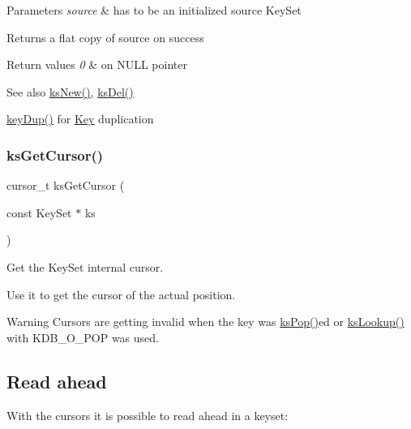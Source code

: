 \begin{DoxyParams}{Parameters}
{\em source} & has to be an initialized source Key\+Set \\
\hline
\end{DoxyParams}
\begin{DoxyReturn}{Returns}
a flat copy of source on success 
\end{DoxyReturn}

\begin{DoxyRetVals}{Return values}
{\em 0} & on N\+U\+LL pointer \\
\hline
\end{DoxyRetVals}
\begin{DoxySeeAlso}{See also}
\hyperlink{group__keyset_ga671e1aaee3ae9dc13b4834a4ddbd2c3c}{ks\+New()}, \hyperlink{group__keyset_ga27e5c16473b02a422238c8d970db7ac8}{ks\+Del()} 

\hyperlink{group__key_gae6ec6a60cc4b8c1463fa08623d056ce3}{key\+Dup()} for \hyperlink{group__key}{Key} duplication 
\end{DoxySeeAlso}
\mbox{\label{group__keyset_gaffe507ab9281c322eb16c3e992075d29}} 
\subsubsection{\texorpdfstring{ks\+Get\+Cursor()}{ksGetCursor()}}
{\footnotesize\ttfamily cursor\+\_\+t ks\+Get\+Cursor (\begin{DoxyParamCaption}\item[{const Key\+Set $\ast$}]{ks }\end{DoxyParamCaption})}



Get the Key\+Set internal cursor. 

Use it to get the cursor of the actual position.

\begin{DoxyWarning}{Warning}
Cursors are getting invalid when the key was \hyperlink{group__keyset_gae42530b04defb772059de0600159cf69}{ks\+Pop()}ed or \hyperlink{group__keyset_gaa34fc43a081e6b01e4120daa6c112004}{ks\+Lookup()} with K\+D\+B\+\_\+\+O\+\_\+\+P\+OP was used.
\end{DoxyWarning}
\hypertarget{group__keyset_readahead}{}\subsection{Read ahead}\label{group__keyset_readahead}
With the cursors it is possible to read ahead in a keyset\+:


